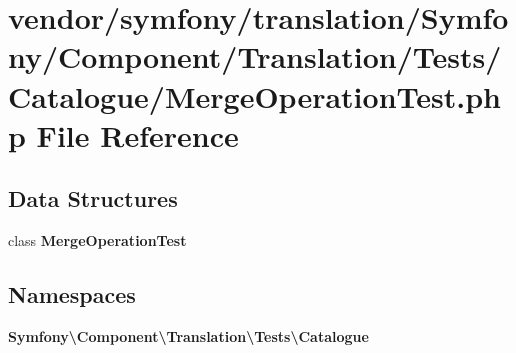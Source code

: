 \section{vendor/symfony/translation/\+Symfony/\+Component/\+Translation/\+Tests/\+Catalogue/\+Merge\+Operation\+Test.php File Reference}
\label{_merge_operation_test_8php}
\subsection*{Data Structures}
\begin{DoxyCompactItemize}
\item 
class {\bf Merge\+Operation\+Test}
\end{DoxyCompactItemize}
\subsection*{Namespaces}
\begin{DoxyCompactItemize}
\item 
 {\bf Symfony\textbackslash{}\+Component\textbackslash{}\+Translation\textbackslash{}\+Tests\textbackslash{}\+Catalogue}
\end{DoxyCompactItemize}
